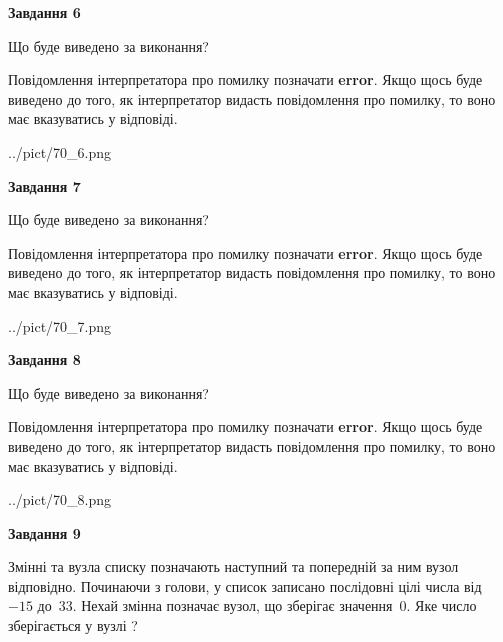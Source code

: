 \documentclass[12pt, ukrainian]{article}
\begin{document}
{\begin {large}
{\begin {center}\textbf{Завдання 6}\end {center}}\par
Що буде виведено за виконання?

Повідомлення інтерпретатора про помилку позначати \textbf{error}.
Якщо щось буде виведено до того, як інтерпретатор видасть повідомлення про помилку, 
то воно має вказуватись у відповіді. \par


\begin{center}
	{../pict/70_6.png}
\end{center}
\newpage

{\begin {center}\textbf{Завдання 7}\end {center}}\par
Що буде виведено за виконання?

Повідомлення інтерпретатора про помилку позначати \textbf{error}.
Якщо щось буде виведено до того, як інтерпретатор видасть повідомлення про помилку, 
то воно має вказуватись у відповіді. \par


\begin{center}
	{../pict/70_7.png}
\end{center}
\newpage

{\begin {center}\textbf{Завдання 8}\end {center}}\par
Що буде виведено за виконання?

Повідомлення інтерпретатора про помилку позначати \textbf{error}.
Якщо щось буде виведено до того, як інтерпретатор видасть повідомлення про помилку, 
то воно має вказуватись у відповіді. \par


\begin{center}
	{../pict/70_8.png}
\end{center}
\newpage

{\begin {center}\textbf{Завдання 9}\end {center}}\par
Змінні  та  вузла списку позначають наступний та попередній за ним вузол відповідно. Починаючи з голови, у список записано послідовні цілі числа від~$-15$ до~$33$. Нехай змінна  позначає вузол, що зберігає значення~$0$.
Яке число зберігається у вузлі  ?\par
\newpage


\end{large}}
\end{document}

